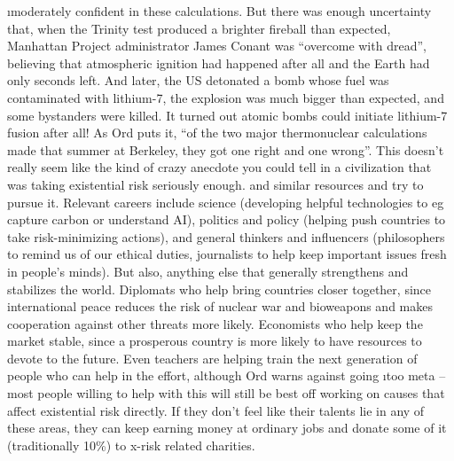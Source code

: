 \begin{xmlentries}
\begin{xmlentriescontent}
{\i{moderately} confident in these calculations. But there was enough uncertainty that, when the Trinity test produced a brighter fireball than expected, Manhattan Project administrator James Conant was “overcome with dread”, believing that atmospheric ignition had happened after all and the Earth had only seconds left. And later, the US detonated a bomb whose fuel was contaminated with lithium-7, the explosion was much bigger than expected, and some bystanders were killed. It turned out atomic bombs could initiate lithium-7 fusion after all! As Ord puts it, “of the two major thermonuclear calculations made that summer at Berkeley, they got one right and one wrong”. This doesn’t really seem like the kind of crazy anecdote you could tell in a civilization that was taking existential risk seriously enough.
 and similar resources and try to pursue it. Relevant careers include science (developing helpful technologies to eg capture carbon or understand AI), politics and policy (helping push countries to take risk-minimizing actions), and general thinkers and influencers (philosophers to remind us of our ethical duties, journalists to help keep important issues fresh in people’s minds). But also, anything else that generally strengthens and stabilizes the world. Diplomats who help bring countries closer together, since international peace reduces the risk of nuclear war and bioweapons and makes cooperation against other threats more likely. Economists who help keep the market stable, since a prosperous country is more likely to have resources to devote to the future. Even teachers are helping train the next generation of people who can help in the effort, although Ord warns against going \i{too} meta – most people willing to help with this will still be best off working on causes that affect existential risk directly. If they don’t feel like their talents lie in any of these areas, they can keep earning money at ordinary jobs and donate some of it (traditionally 10\%) to x-risk related charities.
}
\end{xmlentriescontent}
\end{xmlentries}
